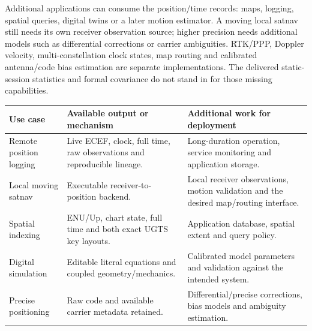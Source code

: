 Additional applications can consume the position/time records: maps, logging,
spatial queries, digital twins or a later motion estimator. A moving local satnav
still needs its own receiver observation source; higher precision needs additional
models such as differential corrections or carrier ambiguities. RTK/PPP, Doppler
velocity, multi-constellation clock states, map routing and calibrated antenna/code
bias estimation are separate implementations. The delivered static-session
statistics and formal covariance do not stand in for those missing capabilities.

\begin{center}
\begin{tabularx}{\textwidth}{@{}P{.28\textwidth}YY@{}}\toprule
\textbf{Use case} & \textbf{Available output or mechanism} & \textbf{Additional work for deployment}\\\midrule
Remote position logging & Live ECEF, clock, full time, raw observations and reproducible lineage. & Long-duration operation, service monitoring and application storage.\\
Local moving satnav & Executable receiver-to-position backend. & Local receiver observations, motion validation and the desired map/routing interface.\\
Spatial indexing & ENU/Up, chart state, full time and both exact UGTS key layouts. & Application database, spatial extent and query policy.\\
Digital simulation & Editable literal equations and coupled geometry/mechanics. & Calibrated model parameters and validation against the intended system.\\
Precise positioning & Raw code and available carrier metadata retained. & Differential/precise corrections, bias models and ambiguity estimation.\\\bottomrule
\end{tabularx}
\end{center}
\clearpage
